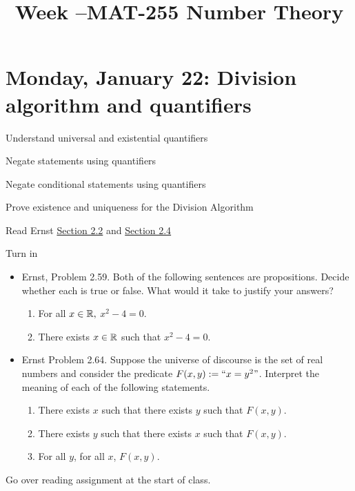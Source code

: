 \documentclass{ximera}
\title{Week \week--MAT-255 Number Theory}
\begin{document}
\section{Monday, January 22: Division algorithm and quantifiers}

\begin{obj}
\item  Understand universal and existential quantifiers
\item  Negate statements using quantifiers
\item Negate conditional statements using quantifiers
\item Prove existence and uniqueness for the Division Algorithm
\end{obj}

\begin{pre}
 \item[Read] Ernst \href{https://danaernst.com/IBL-IntroToProof/pretext/sec_Intro_to_Logic.html}{Section 2.2} and \href{https://danaernst.com/IBL-IntroToProof/pretext/sec_Introduction_to_Quantification.html}{Section 2.4}
 
 \item[Turn in] 
 
\begin{itemize}
 
\item Ernst, Problem 2.59.
Both of the following sentences are propositions. Decide whether each is true or false. What would it take to justify your answers?
\begin{enumerate}%
 \item For all $x\in\mathbb R,$ $x^2-4=0$.

 \item There exists $x\in\mathbb R$ such that $x^2-4=0$.

\end{enumerate}

\item  Ernst Problem 2.64.
 Suppose the universe of discourse is the set of real numbers and consider the predicate $F(x,y):=``x=y^2"$.
Interpret the meaning of each of the following statements.
\begin{enumerate}%
 \item There exists $x$ such that there exists $y$ such that $F(x,y)$.


 \item There exists $y$ such that there exists $x$ such that $F(x,y)$.


\item For all $y$, for all $x$, $F(x,y)$.
 

 \end{enumerate}

\end{itemize}
\end{pre}
Go over reading assignment at the start of class.
\end{document}
